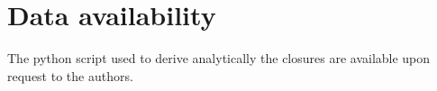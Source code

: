 \documentclass[11pt]{My_preprint}
\begin{document}
\section*{Data availability}

The python script used to derive analytically the closures are available upon request to the authors. 


\appendix







\end{document}
